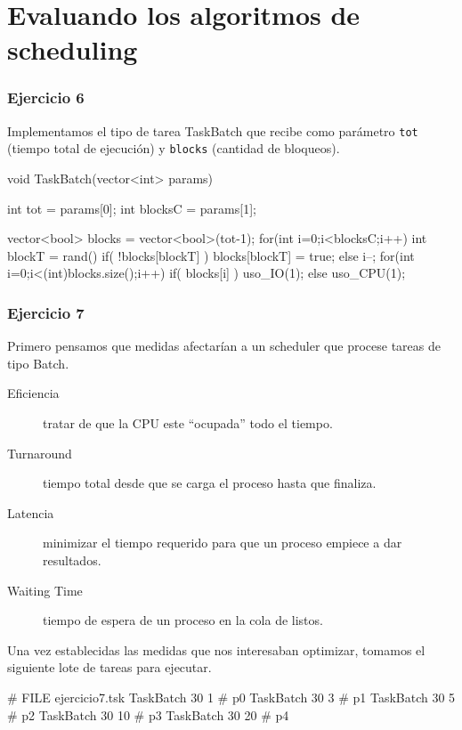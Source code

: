 \part{Evaluando los algoritmos de scheduling}

\section{Ejercicio 6}

Implementamos el tipo de tarea TaskBatch que recibe como par\'ametro \verb|tot| (tiempo total de ejecuci\'on) y \verb|blocks| (cantidad de bloqueos).

\begin{framed}
\begin{verbatimtab}
void TaskBatch(vector<int> params) {
	int tot = params[0];
	int blocksC = params[1];
	
	vector<bool> blocks = vector<bool>(tot-1);
	for(int i=0;i<blocksC;i++) {
		int blockT = rand()%
		if( !blocks[blockT] )
			blocks[blockT] = true;
		else
			i--;
	}
	for(int i=0;i<(int)blocks.size();i++) {
		if( blocks[i] )
			uso_IO(1);
		else
			uso_CPU(1);
	}
}
\end{verbatimtab}
\end{framed}

\section{Ejercicio 7}

Primero pensamos que medidas afectar\'ian a un scheduler que procese tareas de tipo Batch.

\begin{description}
 \item[Eficiencia] tratar de que la CPU este ``ocupada'' todo el tiempo.
 \item[Turnaround] tiempo total desde que se carga el proceso hasta que finaliza.
 \item[Latencia] minimizar el tiempo requerido para que un proceso empiece a dar resultados.
 \item[Waiting Time] tiempo de espera de un proceso en la cola de listos.
\end{description}

Una vez establecidas las medidas que nos interesaban optimizar, tomamos el siguiente lote de tareas para ejecutar.

\begin{framed}
\begin{verbatimtab}
# FILE ejercicio7.tsk
TaskBatch	 	30  1  # p0
TaskBatch	 	30  3  # p1
TaskBatch	 	30  5  # p2
TaskBatch	 	30 10  # p3
TaskBatch	 	30 20  # p4
\end{verbatimtab}
\end{framed}

